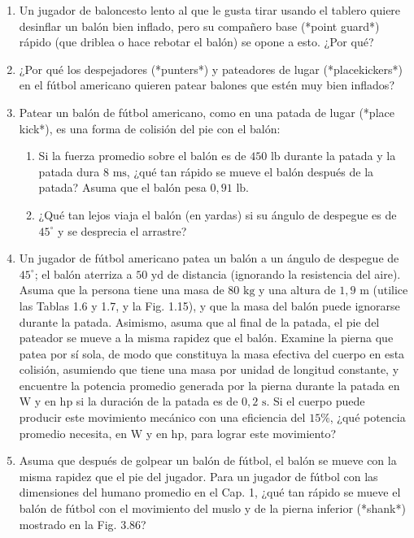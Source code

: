 \documentclass[12pt]{book}
\begin{document}
\begin{enumerate}
\item[3.170] Un jugador de baloncesto lento al que le gusta tirar usando el tablero quiere desinflar un balón bien inflado, pero su compañero base (*point guard*) rápido (que driblea o hace rebotar el balón) se opone a esto. ¿Por qué?

\item[3.171] ¿Por qué los despejadores (*punters*) y pateadores de lugar (*placekickers*) en el fútbol americano quieren patear balones que estén muy bien inflados?

\item[3.172] Patear un balón de fútbol americano, como en una patada de lugar (*place kick*), es una forma de colisión del pie con el balón:
\begin{enumerate}
\item[(a)] Si la fuerza promedio sobre el balón es de $450\text{ lb}$ durante la patada y la patada dura $8\text{ ms}$, ¿qué tan rápido se mueve el balón después de la patada? Asuma que el balón pesa $0{,}91\text{ lb}$.
\item[(b)] ¿Qué tan lejos viaja el balón (en yardas) si su ángulo de despegue es de $45^\circ$ y se desprecia el arrastre?
\end{enumerate}

\item[3.173] Un jugador de fútbol americano patea un balón a un ángulo de despegue de $45^\circ$; el balón aterriza a $50\text{ yd}$ de distancia (ignorando la resistencia del aire). Asuma que la persona tiene una masa de $80\text{ kg}$ y una altura de $1{,}9\text{ m}$ (utilice las Tablas 1.6 y 1.7, y la Fig. 1.15), y que la masa del balón puede ignorarse durante la patada. Asimismo, asuma que al final de la patada, el pie del pateador se mueve a la misma rapidez que el balón. Examine la pierna que patea por sí sola, de modo que constituya la masa efectiva del cuerpo en esta colisión, asumiendo que tiene una masa por unidad de longitud constante, y encuentre la potencia promedio generada por la pierna durante la patada en $\text{W}$ y en $\text{hp}$ si la duración de la patada es de $0{,}2\text{ s}$. Si el cuerpo puede producir este movimiento mecánico con una eficiencia del $15\%$, ¿qué potencia promedio necesita, en $\text{W}$ y en $\text{hp}$, para lograr este movimiento?

\item[3.174] Asuma que después de golpear un balón de fútbol, el balón se mueve con la misma rapidez que el pie del jugador. Para un jugador de fútbol con las dimensiones del humano promedio en el Cap. 1, ¿qué tan rápido se mueve el balón de fútbol con el movimiento del muslo y de la pierna inferior (*shank*) mostrado en la Fig. 3.86?


\end{enumerate}
\end{document}
